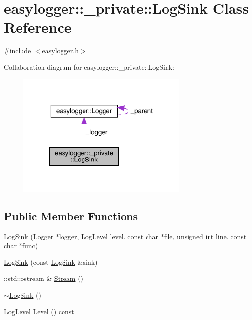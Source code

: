 \hypertarget{classeasylogger_1_1__private_1_1_log_sink}{}\section{easylogger\+:\+:\+\_\+private\+:\+:Log\+Sink Class Reference}
\label{classeasylogger_1_1__private_1_1_log_sink}


{\ttfamily \#include $<$easylogger.\+h$>$}



Collaboration diagram for easylogger\+:\+:\+\_\+private\+:\+:Log\+Sink\+:\nopagebreak
\begin{figure}[H]
\begin{center}
\leavevmode
\includegraphics[width=239pt]{classeasylogger_1_1__private_1_1_log_sink__coll__graph}
\end{center}
\end{figure}
\subsection*{Public Member Functions}
\begin{DoxyCompactItemize}
\item 
\mbox{\hyperlink{classeasylogger_1_1__private_1_1_log_sink_a3b9242d120d168d80ec77d4941588a6e}{Log\+Sink}} (\mbox{\hyperlink{classeasylogger_1_1_logger}{Logger}} $\ast$logger, \mbox{\hyperlink{namespaceeasylogger_a68cb882ead21af982c40e3621fcd50b0}{Log\+Level}} level, const char $\ast$file, unsigned int line, const char $\ast$func)
\item 
\mbox{\hyperlink{classeasylogger_1_1__private_1_1_log_sink_a2f7f651290b941c6fe13f2357854a3c3}{Log\+Sink}} (const \mbox{\hyperlink{classeasylogger_1_1__private_1_1_log_sink}{Log\+Sink}} \&sink)
\item 
\+::std\+::ostream \& \mbox{\hyperlink{classeasylogger_1_1__private_1_1_log_sink_a6d6aa70a384a424a1c566320bf1cdcdf}{Stream}} ()
\item 
\mbox{\hyperlink{classeasylogger_1_1__private_1_1_log_sink_a73dbb1df32e0ec8b6c6def939cae7b5c}{$\sim$\+Log\+Sink}} ()
\item 
\mbox{\hyperlink{namespaceeasylogger_a68cb882ead21af982c40e3621fcd50b0}{Log\+Level}} \mbox{\hyperlink{classeasylogger_1_1__private_1_1_log_sink_a00fcf48f0e15153d33f05822f3ca006d}{Level}} () const
\end{DoxyCompactItemize}
